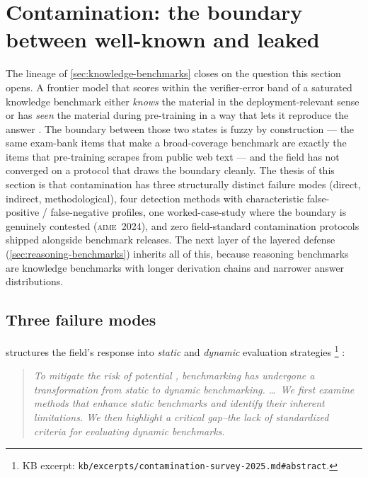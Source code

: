 
\section{Contamination: the boundary between well-known and leaked}
\label{sec:contamination}

The  lineage of \cref{sec:knowledge-benchmarks} closes on the
question this section opens. A frontier model that scores within the
verifier-error band of a saturated knowledge benchmark either
\emph{knows} the material in the deployment-relevant sense or has
\emph{seen} the material during pre-training in a way that lets it
reproduce the answer . The boundary between those two states is
fuzzy by construction --- the same exam-bank items that make  a
broad-coverage benchmark are exactly the items that pre-training
scrapes from public web text --- and the field has not converged on a
protocol that draws the boundary cleanly. The thesis of this section
is that contamination has three structurally distinct failure modes
(direct, indirect, methodological), four detection methods with
characteristic false-positive / false-negative profiles, one
worked-case-study where the boundary is genuinely contested
(\textsc{aime~2024}), and zero field-standard contamination protocols
shipped alongside benchmark releases. The next layer of the layered
defense (\cref{sec:reasoning-benchmarks}) inherits all of this, because
reasoning benchmarks are knowledge benchmarks with longer derivation
chains and narrower answer distributions.

\subsection{Three failure modes}
\label{sec:contamination-modes}

\citet{contamination-survey-2025} structures the field's response into
\emph{static} and \emph{dynamic} evaluation strategies%
\footnote{KB excerpt: \texttt{kb/excerpts/contamination-survey-2025.md\#abstract}.}
\citep[\S{}abstract]{contamination-survey-2025}:

\begin{quote}\itshape
To mitigate the risk of potential ,  benchmarking
has undergone a transformation from static to dynamic benchmarking.
\ldots\ We first examine methods that enhance static benchmarks and
identify their inherent limitations. We then highlight a critical
gap--the lack of standardized criteria for evaluating dynamic
benchmarks.
\end{quote}

